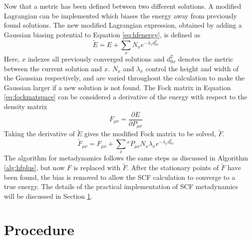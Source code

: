 \documentclass[final,3p,times,twocolumn]{elsarticle}
\begin{document}
Now that a metric has been defined between two different solutions. A modified Lagrangian can be implemented which biases the energy away from previously found solutions. The new modified Lagrangian expression, obtained by adding a Gaussian biasing potential to Equation \eqref{eq:hfenergy}, is defined as
\begin{equation} \label{eq:mdenergy}
\tilde E = E + \sum_x N_xe^{-\lambda_xd_{0x}^2}
\end{equation}
Here, $x$ indexes all previously converged solutions and $d_{0x}^2$ denotes the metric between the current solution and $x$. $N_x$ and $\lambda_x$ control the height and width of the Gaussian respectively, and are varied throughout the calculation to make the Gaussian larger if a new solution is not found. The Fock matrix in Equation \eqref{eq:fockmatspace} can be considered a derivative of the energy with respect to the density matrix
\begin{equation}
F_{\mu\nu} = \frac{\partial E}{\partial P_{\mu\nu}}
\end{equation}
Taking the derivative of $\tilde E$ gives the modified Fock matrix to be solved, $\tilde F$.
\begin{equation} \label{eq:biasfock}
\tilde F_{\mu\nu} = F_{\mu\nu} + \sum_x{}^xP_{\mu\nu}N_x\lambda_x e^{-\lambda_x d_{0x}^2}
\end{equation}
The algorithm for metadynamics follows the same steps as discussed in Algorithm \ref{alg:hfplus}, but now $F$ is replaced with $\tilde F$. After the stationary points of $\tilde F$ have been found, the bias is removed to allow the SCF calculation to converge to a true energy. The details of the practical implementation of SCF metadynamics will be discussed in Section \ref{sec:scfmdalg}.

\section{Procedure}\label{sec:scfmdalg}
\end{document}
